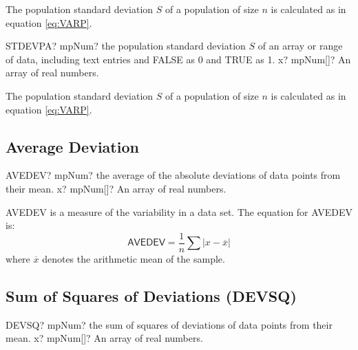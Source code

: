 The population standard deviation $S$ of a population of size $n$ is calculated as in equation \ref{eq:VARP}.



\vspace{0.6cm}
\begin{mpFunctionsExtract}
	\mpWorksheetFunctionOneNotImplemented
	{STDEVPA? mpNum? the population standard deviation $S$ of an array or range of data, including text entries and FALSE as 0 and TRUE as 1.}
	{x? mpNum[]? An array of real numbers.}
\end{mpFunctionsExtract}

The population standard deviation $S$ of a population of size $n$ is calculated as in equation \ref{eq:VARP}.






\subsection{Average Deviation}

\begin{mpFunctionsExtract}
	\mpWorksheetFunctionOneNotImplemented
	{AVEDEV? mpNum? the average of the absolute deviations of data points from their mean.}
	{x? mpNum[]? An array of real numbers.}
\end{mpFunctionsExtract}

\vspace{0.3cm}

\textsf{AVEDEV} is a measure of the variability in a data set. The equation for \textsf{AVEDEV} is: 
\begin{equation}
	\textsf{AVEDEV} = \frac{1}{n}\sum |x-\overline{x}|
\end{equation}
where $\overline{x}$ denotes the arithmetic mean of the sample.




\subsection{Sum of Squares of Deviations (DEVSQ)}

\begin{mpFunctionsExtract}
	\mpWorksheetFunctionOneNotImplemented
	{DEVSQ? mpNum? the sum of squares of deviations of data points from their mean.}
	{x? mpNum[]? An array of real numbers.}
\end{mpFunctionsExtract}

\vspace{0.3cm}

